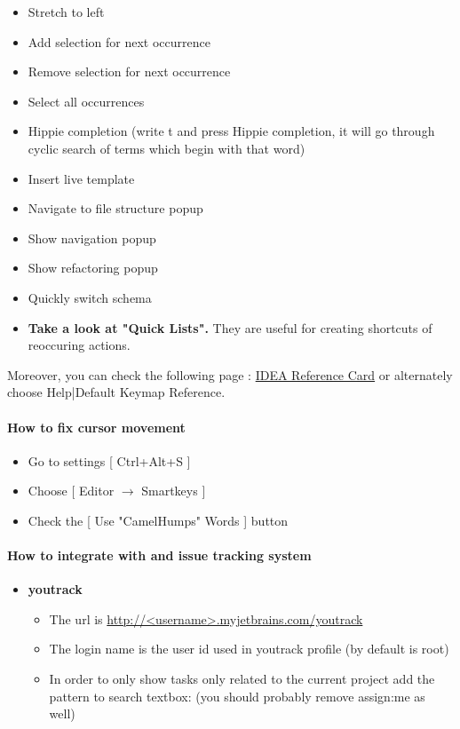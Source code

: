 \begin{itemize}
\begin{itemize}
		\item Stretch to left  
		\item Add selection for next occurrence  
		\item Remove selection for next occurrence  
		\item Select all occurrences  
		\item Hippie completion  (write t and press Hippie completion, it will go through cyclic search of terms which begin with that word)
		\item Insert live template 
		\item Navigate to file structure popup 
		\item Show navigation popup 
		\item Show refactoring popup 
		\item Quickly switch schema 
		\item \textbf{Take a look at "Quick Lists".} They are useful for creating shortcuts of reoccuring actions.

	\end{itemize}
\end{itemize}
Moreover, you can check the following page : \href{https://www.jetbrains.com/idea/docs/IntelliJIDEA_ReferenceCard.pdf}{IDEA Reference Card} or alternately choose Help|Default Keymap Reference.

\paragraph{How to fix cursor movement}
	\begin{itemize}
		\item Go to settings [ Ctrl+Alt+S ]
		\item Choose [ Editor $\rightarrow$ Smartkeys ]
		\item Check the [ Use "CamelHumps" Words ] button
	\end{itemize}

\paragraph{How to integrate with and issue tracking system}

\begin{itemize}
	\item \textbf{youtrack}
	\begin{itemize}
		\item The url is \href{}{http://<username>.myjetbrains.com/youtrack}
		\item The login name is the user id used in youtrack profile (by default is root)
		\item In order to only show tasks only related to the current project add the pattern to search textbox:  (you should probably remove assign:me as well)
	\end{itemize}	
\end{itemize}

